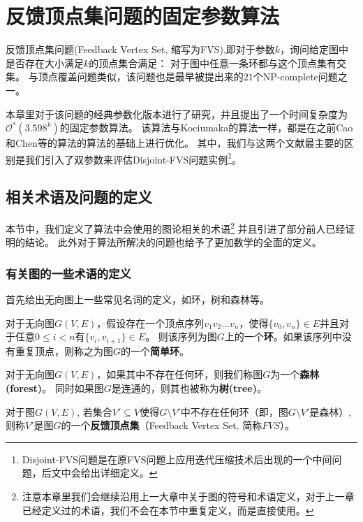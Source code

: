 \chapter{反馈顶点集问题的固定参数算法}
反馈顶点集问题(Feedback Vertex Set, 缩写为FVS),即对于参数$k$，询问给定图中是否存在大小满足$k$的顶点集合满足：
对于图中任意一条环都与这个顶点集有交集。
与顶点覆盖问题类似，该问题也是最早被提出来的$21$个NP-complete问题之一。

本章里对于该问题的经典参数化版本进行了研究，并且提出了一个时间复杂度为$\mathcal{O}^*(3.598^k)$的固定参数算法。
该算法与Kociumaka的算法一样，都是在之前Cao和Chen等的算法的算法的基础上进行优化。
其中，我们与这两个文献最主要的区别是我们引入了双参数来评估Disjoint-FVS问题实例\footnote{Disjoint-FVS问题是在原FVS问题上应用迭代压缩技术后出现的一个中间问题，后文中会给出详细定义。}。

\section{相关术语及问题的定义}
本节中，我们定义了算法中会使用的图论相关的术语\footnote{注意本章里我们会继续沿用上一大章中关于图的符号和术语定义，对于上一章已经定义过的术语，我们不会在本节中重复定义，而是直接使用。}
并且引进了部分前人已经证明的结论。
此外对于算法所解决的问题也给予了更加数学的全面的定义。


\subsection{有关图的一些术语的定义}
首先给出无向图上一些常见名词的定义，如环，树和森林等。
\begin{definition}[环]
对于无向图$G(V,E)$，假设存在一个顶点序列$v_1v_2...v_n$，使得$\{v_0, v_n\} \in E$并且对于任意$0 \le i < n$有$\{v_i, v_{i+1}\} \in E$。
则该序列为图$G$上的一个\textbf{环}。如果该序列中没有重复顶点，则称之为图$G$的一个\textbf{简单环}。
\end{definition}

\begin{definition}
对于无向图$G(V,E)$，如果其中不存在任何环，则我们称图$G$为一个\textbf{森林(forest)}。
同时如果图$G$是连通的，则其也被称为\textbf{树(tree)}。
\end{definition}

\begin{definition}[反馈顶点集]
对于图$G(V, E)$, 若集合$V' \subseteq V$使得$G \setminus V'$中不存在任何环（即，图$G \setminus V'$是森林）,
则称$V'$是图$G$的一个\textbf{反馈顶点集}（Feedback Vertex Set, 简称$FVS$）。
\end{definition}

